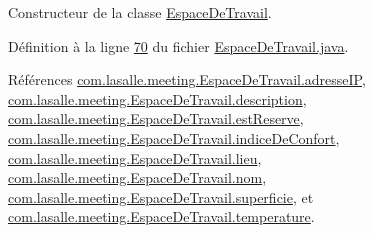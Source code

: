 Constructeur de la classe \hyperlink{classcom_1_1lasalle_1_1meeting_1_1_espace_de_travail}{Espace\+De\+Travail}. 



Définition à la ligne \hyperlink{_espace_de_travail_8java_source_l00070}{70} du fichier \hyperlink{_espace_de_travail_8java_source}{Espace\+De\+Travail.\+java}.



Références \hyperlink{_espace_de_travail_8java_source_l00031}{com.\+lasalle.\+meeting.\+Espace\+De\+Travail.\+adresse\+IP}, \hyperlink{_espace_de_travail_8java_source_l00034}{com.\+lasalle.\+meeting.\+Espace\+De\+Travail.\+description}, \hyperlink{_espace_de_travail_8java_source_l00038}{com.\+lasalle.\+meeting.\+Espace\+De\+Travail.\+est\+Reserve}, \hyperlink{_espace_de_travail_8java_source_l00037}{com.\+lasalle.\+meeting.\+Espace\+De\+Travail.\+indice\+De\+Confort}, \hyperlink{_espace_de_travail_8java_source_l00033}{com.\+lasalle.\+meeting.\+Espace\+De\+Travail.\+lieu}, \hyperlink{_espace_de_travail_8java_source_l00032}{com.\+lasalle.\+meeting.\+Espace\+De\+Travail.\+nom}, \hyperlink{_espace_de_travail_8java_source_l00035}{com.\+lasalle.\+meeting.\+Espace\+De\+Travail.\+superficie}, et \hyperlink{_espace_de_travail_8java_source_l00036}{com.\+lasalle.\+meeting.\+Espace\+De\+Travail.\+temperature}.


